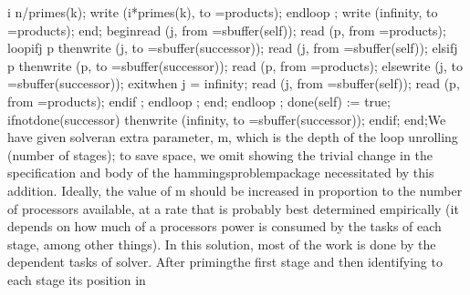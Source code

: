 \tyxtstxendbf[] i \Symgt[] n/primes(k);
               write (i*primes(k), to =\Symgt[] products);
            \tyxtstxbf[]end\tyxtstxendbf[] \tyxtstxbf[]loop%
\tyxtstxendbf[];
            write (infinity, to =\Symgt[] products);
         \tyxtstxbf[]end\tyxtstxendbf[];
      \tyxtstxbf[]begin\tyxtstxendbf[]
         read (j, from =\Symgt[] sbuffer(self));
         read (p, from =\Symgt[] products);
         \tyxtstxbf[]loop\tyxtstxendbf[]
            \tyxtstxbf[]if\tyxtstxendbf[]    j \Symlt[] p %
\tyxtstxbf[]then\tyxtstxendbf[]
               write (j, to   =\Symgt[] sbuffer(successor));
               read  (j, from =\Symgt[] sbuffer(self));
            \tyxtstxbf[]elsif\tyxtstxendbf[] j \Symgt[] p %
\tyxtstxbf[]then\tyxtstxendbf[]
               write (p, to   =\Symgt[] sbuffer(successor));
               read  (p, from =\Symgt[] products);
            \tyxtstxbf[]else\tyxtstxendbf[]
               write (j, to   =\Symgt[] sbuffer(successor));
         \tyxtstxbf[]exit\tyxtstxendbf[] \tyxtstxbf[]when%
\tyxtstxendbf[] j = infinity;
               read  (j, from =\Symgt[] sbuffer(self));
               read  (p, from =\Symgt[] products);
            \tyxtstxbf[]end\tyxtstxendbf[] \tyxtstxbf[]if%
\tyxtstxendbf[];
         \tyxtstxbf[]end\tyxtstxendbf[] \tyxtstxbf[]loop%
\tyxtstxendbf[];
      \tyxtstxbf[]end\tyxtstxendbf[];
   \tyxtstxbf[]end\tyxtstxendbf[] \tyxtstxbf[]loop%
\tyxtstxendbf[];
   done(self) := true;
   \tyxtstxbf[]if\tyxtstxendbf[] \tyxtstxbf[]not\tyxtstxendbf[] done(successor) %
\tyxtstxbf[]then\tyxtstxendbf[]
      write (infinity, to =\Symgt[] sbuffer(successor));
   \tyxtstxbf[]end\tyxtstxendbf[] \tyxtstxbf[]if\tyxtstxendbf[];
\tyxtstxbf[]end\tyxtstxendbf[];\Endcomp[]
\EndParbox[]
\FgEndblock[]
\Endpara[]
\Para[]We have given \tyxffmxmono[]solver\tyxffmxendmono[] an extra
parameter, \tyxffmxmono[]m\tyxffmxendmono[], which is the depth of
the loop unrolling (number of stages); to save space, we omit showing
the trivial change in the specification and body of the %
\tyxffmxmono[]hammings\Symuns[]problem\tyxffmxendmono[] package necessitated
by this addition. Ideally, the value of \tyxffmxmono[]m%
\tyxffmxendmono[] should be increased in proportion to the number
of processors available, at a rate that is probably best determined
empirically (it depends on how much of a processor\rsquo[]s power
is consumed by the tasks of each stage, among other things).%
\Endpara[]
\Para[]In this solution, most of the work is done by the dependent
tasks of \tyxffmxmono[]solver\tyxffmxendmono[]. After \ldquo[]priming\rdquo[]
the first stage and then identifying to each stage its position in
